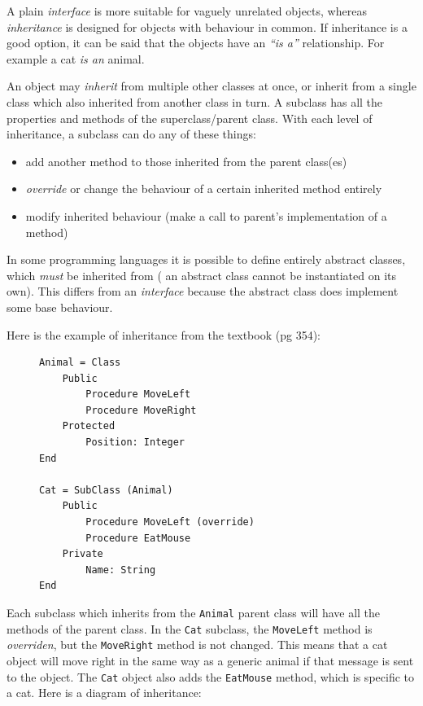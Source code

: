 \documentclass[10pt]{article}
\begin{document}
A plain \emph{interface} is more suitable for vaguely unrelated objects, whereas \emph{inheritance} is designed for objects with behaviour in common. If inheritance is a good option, it can be said that the objects have an \emph{``is a''} relationship. For example a cat \emph{is an} animal.

An object may \emph{inherit} from multiple other classes at once, or inherit from a single class which also inherited from another class in turn. A subclass has all the properties and methods of the superclass/parent class. With each level of inheritance, a subclass can do any of these things:

\begin{itemize}
\item add another method to those inherited from the parent class(es)
\item \emph{override} or change the behaviour of a certain inherited method entirely
\item modify inherited behaviour (make a call to parent's implementation of a method)
\end{itemize}

In some programming languages it is possible to define entirely abstract classes, which \emph{must} be inherited from ( an abstract class cannot be instantiated on its own). This differs from an \emph{interface} because the abstract class does implement some base behaviour.

Here is the example of inheritance from the textbook (pg 354):

\begin{figure}[H]
\begin{verbatim}
Animal = Class
    Public
        Procedure MoveLeft
        Procedure MoveRight
    Protected
        Position: Integer
End

Cat = SubClass (Animal)
    Public
        Procedure MoveLeft (override)
        Procedure EatMouse
    Private
        Name: String
End
\end{verbatim}
\end{figure}


Each subclass which inherits from the \texttt{Animal} parent class will have all the methods of the parent class. In the \texttt{Cat} subclass, the \texttt{MoveLeft} method is \emph{overriden}, but the \texttt{MoveRight} method is not changed. This means that a cat object will move right in the same way as a generic animal if that message is sent to the object. The \texttt{Cat} object also adds the \texttt{EatMouse} method, which is specific to a cat. Here is a diagram of inheritance:
\end{document}
